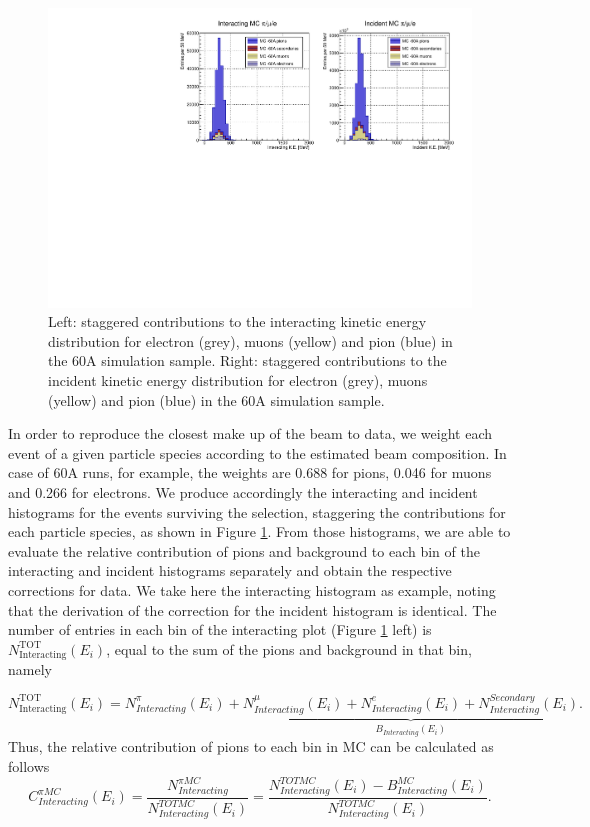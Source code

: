 \begin{figure}[p]
\centering
\includegraphics[width=\textwidth]{Chapter-5/Images/Background60A.pdf}
\caption{Left: staggered contributions to the interacting kinetic energy distribution for electron (grey), muons (yellow) and pion (blue) in the 60A simulation sample. Right: staggered contributions to the incident kinetic energy distribution for electron (grey), muons (yellow) and pion (blue) in the 60A simulation sample.  }
\label{fig:stag60A}
\end{figure}

In order to reproduce the closest make up of the beam to data, we weight each event of a given particle species according to the estimated beam composition. In case of 60A runs, for example, the weights are 0.688 for pions,  0.046 for muons  and 0.266 for electrons.
We produce accordingly the interacting and incident histograms for the events surviving the selection, staggering the contributions for each particle species, as shown in Figure  \ref{fig:stag60A}. From those histograms, we are able to evaluate the relative contribution of  pions and  background to each bin of the interacting and incident histograms separately and obtain the respective corrections for data. We take here the interacting histogram as example, noting that the derivation of the correction for the incident histogram is identical. The number of entries in each bin of the interacting plot (Figure \ref{fig:stag60A} left) is  $N^{\text{TOT}}_{\text{Interacting}} (E_{i})$, equal to the sum of the pions and background in that bin, namely

\begin{equation}
N^{\text{TOT}}_{\text{Interacting}} (E_{i}) =  N^\pi_{Interacting} (E_{i}) + \underbrace{ N^\mu_{Interacting} (E_{i}) + N^e_{Interacting} (E_{i}) + N^{Secondary}_{Interacting} (E_{i}) }_{B_{Interacting} (E_i)}.
\end{equation}
Thus, the relative contribution of pions to each bin in MC can be calculated as follows
\begin{equation}
C^{\pi MC}_{Interacting} (E_{i}) =  \frac{N^{\pi MC}_{Interacting}}{ N^{TOT MC}_{Interacting} (E_{i}) } =    \frac{N^{TOT MC}_{Interacting} (E_{i}) - B^ {MC}_{Interacting} (E_i)}{ N^{TOT MC}_{Interacting} (E_{i})}.
\end{equation}



